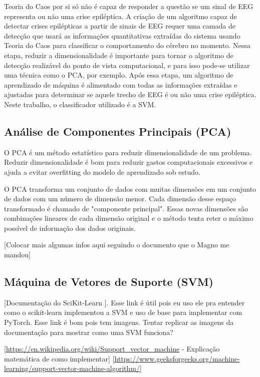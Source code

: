 \documentclass[]{article}
\begin{document}
	Teoria do Caos por si só não é capaz de responder a questão se um sinal de EEG representa ou não uma crise epiléptica. A criação de um algoritmo capaz de detectar crises epilépticas a partir de sinais de EEG requer uma camada de detecção que usará as informações quantitativas extraídas do sistema usando Teoria do Caos para classificar o comportamento do cérebro no momento.
	Nessa etapa, reduzir a dimensionalidade é importante para tornar o algoritmo de detecção realizável do ponto de vista computacional, e para isso pode-se utilizar uma técnica como o PCA, por exemplo. Após essa etapa, um algoritmo de aprendizado de máquina é alimentado com todas as informações extraídas e ajustadas para determinar se aquele trecho de EEG é ou não uma crise epiléptica. Neste trabalho, o classificador utilizado é a SVM.
	
	\subsection{Análise de Componentes Principais (PCA)}
	\label{subsec:pca}
	\noindent
	
	O PCA é um método estatístico para reduzir dimensionalidade de um problema. 
	Reduzir dimensionalidade é bom para reduzir gastos computacionais excessivos e ajuda a evitar overfitting do modelo de aprendizado sob estudo.
	
	O PCA transforma um conjunto de dados com muitas dimensões em um conjunto de dados com um número de dimensão menor. Cada dimensão desse espaço transformado é chamado de "componente principal".	Essas novas dimensões são combinações lineares de cada dimensão original e o método tenta reter o máximo possível de informação dos dados originais.
	
	[Colocar mais algumas infos aqui seguindo o documento que o Magno me mandou]
	\subsection{Máquina de Vetores de Suporte (SVM)}
	\noindent
	
	[Documentação do SciKit-Learn \cite{scikitlearn_svm}]. Esse link é útil pois eu uso ele pra entender como o scikit-learn implementou a SVM e uso de base para implementar com PyTorch. Esse link é bom pois tem imagens. Tentar replicar as imagens da documentação para mostrar como uma SVM funciona? 
	
	[\url{https://en.wikipedia.org/wiki/Support_vector_machine} - Explicação matemática de como implementar]
	[\url{https://www.geeksforgeeks.org/machine-learning/support-vector-machine-algorithm/}]
	
\end{document}
